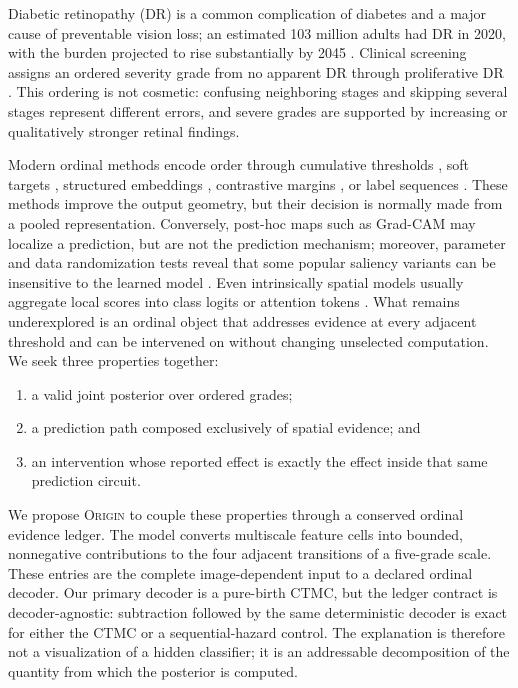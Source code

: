 \documentclass[10pt,twocolumn,letterpaper]{article}
\newcommand{\method}{\textsc{Origin}\xspace}
\begin{document}
Diabetic retinopathy (DR) is a common complication of diabetes and a major
cause of preventable vision loss; an estimated 103 million adults had DR in
2020, with the burden projected to rise substantially by 2045
\cite{teo2021global}.  Clinical screening assigns an ordered severity grade
from no apparent DR through proliferative DR \cite{wilkinson2003severity}.
This ordering is not cosmetic: confusing neighboring stages and skipping
several stages represent different errors, and severe grades are supported by
increasing or qualitatively stronger retinal findings.

Modern ordinal methods encode order through cumulative thresholds
\cite{cao2020coral,shi2023corn}, soft targets \cite{diaz2019sord}, structured
embeddings \cite{li2021poe,lei2024core}, contrastive margins
\cite{pitawela2025cloc,saleem2025hybrid}, or label sequences
\cite{wang2023ord2seq,yu2025aordr}.  These methods improve the output geometry,
but their decision is normally made from a pooled representation.  Conversely,
post-hoc maps such as Grad-CAM \cite{selvaraju2017gradcam} may localize a
prediction, but are not the prediction mechanism; moreover, parameter and
data randomization tests reveal that some popular saliency variants can be
insensitive to the learned model \cite{adebayo2018sanity}.  Even intrinsically
spatial models usually aggregate local scores into class logits
\cite{javed2022additive,donteu2024sparse} or attention tokens
\cite{shiku2025satomil}.  What remains underexplored is an ordinal object that
addresses evidence at every adjacent threshold and can be intervened on
without changing unselected computation.  We seek three properties together:

\begin{enumerate}[leftmargin=*,itemsep=1pt,topsep=2pt]
  \item a valid joint posterior over ordered grades;
  \item a prediction path composed exclusively of spatial evidence; and
  \item an intervention whose reported effect is exactly the effect inside that
        same prediction circuit.
\end{enumerate}

We propose \method to couple these properties through a conserved ordinal
evidence ledger.  The model converts multiscale feature cells into bounded,
nonnegative contributions to the four adjacent transitions of a five-grade
scale.  These entries are the complete image-dependent input to a declared
ordinal decoder.  Our primary decoder is a pure-birth CTMC, but the ledger
contract is decoder-agnostic: subtraction followed by the same deterministic
decoder is exact for either the CTMC or a sequential-hazard control.  The
explanation is therefore not a visualization of a hidden classifier; it is an
addressable decomposition of the quantity from which the posterior is
computed.
\end{document}
